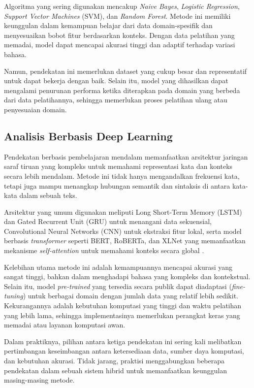Algoritma yang sering digunakan mencakup \textit{Naive Bayes}, \textit{Logistic Regression}, \textit{Support Vector Machines} (SVM), dan \textit{Random Forest}. Metode ini memiliki keunggulan dalam kemampuan belajar dari data domain-spesifik dan menyesuaikan bobot fitur berdasarkan konteks. Dengan data pelatihan yang memadai, model dapat mencapai akurasi tinggi dan adaptif terhadap variasi bahasa.

Namun, pendekatan ini memerlukan dataset yang cukup besar dan representatif untuk dapat bekerja dengan baik. Selain itu, model yang dihasilkan dapat mengalami penurunan performa ketika diterapkan pada domain yang berbeda dari data pelatihannya, sehingga memerlukan proses pelatihan ulang atau penyesuaian domain.

\subsection{Analisis Berbasis Deep Learning}

Pendekatan berbasis pembelajaran mendalam memanfaatkan arsitektur jaringan saraf tiruan yang kompleks untuk memahami representasi kata dan konteks secara lebih mendalam. Metode ini tidak hanya mengandalkan frekuensi kata, tetapi juga mampu menangkap hubungan semantik dan sintaksis di antara kata-kata dalam sebuah teks.

Arsitektur yang umum digunakan meliputi Long Short-Term Memory (LSTM) dan Gated Recurrent Unit (GRU) untuk menangani data sekuensial, Convolutional Neural Networks (CNN) untuk ekstraksi fitur lokal, serta model berbasis \textit{transformer} seperti BERT, RoBERTa, dan XLNet yang memanfaatkan mekanisme \textit{self-attention} untuk memahami konteks secara global \cite{yang2019xlnet}.

Kelebihan utama metode ini adalah kemampuannya mencapai akurasi yang sangat tinggi, bahkan dalam menghadapi bahasa yang kompleks dan kontekstual. Selain itu, model \textit{pre-trained} yang tersedia secara publik dapat diadaptasi (\textit{fine-tuning}) untuk berbagai domain dengan jumlah data yang relatif lebih sedikit. Kekurangannya adalah kebutuhan komputasi yang tinggi dan waktu pelatihan yang lebih lama, sehingga implementasinya memerlukan perangkat keras yang memadai atau layanan komputasi awan.

Dalam praktiknya, pilihan antara ketiga pendekatan ini sering kali melibatkan pertimbangan keseimbangan antara ketersediaan data, sumber daya komputasi, dan kebutuhan akurasi. Tidak jarang, praktisi menggabungkan beberapa pendekatan dalam sebuah sistem hibrid untuk memanfaatkan keunggulan masing-masing metode.


